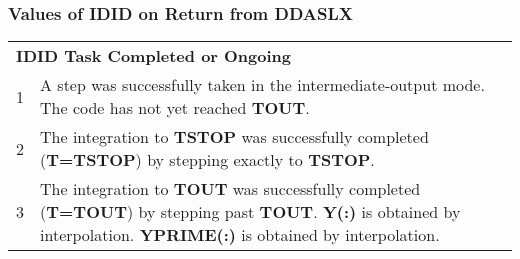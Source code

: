 \documentclass[twoside]{MATH77}
\begin{document}
\subsubsection{Values of \textbf{IDID} on Return from DDASLX\label{IDID_vals}}

\begin{tabular}{rp{2.8in}}
  \multicolumn{2}{l}{\bf IDID \hspace{.4in}  Task Completed or Ongoing}\\
  \phantom{$-2$}1 & A step was successfully taken in the intermediate-output
  mode. The code has not yet reached \textbf{TOUT}.\\
  2 & The integration to \textbf{TSTOP} was successfully
  completed (\textbf{T=TSTOP}) by stepping exactly to \textbf{TSTOP}.\\
  3 & The integration to \textbf{TOUT} was successfully
  completed (\textbf{T=TOUT}) by stepping past \textbf{TOUT}.  \textbf{Y(:)} is
  obtained by interpolation. \textbf{YPRIME(:)} is obtained by interpolation.\\
\end{tabular}
\end{document}
